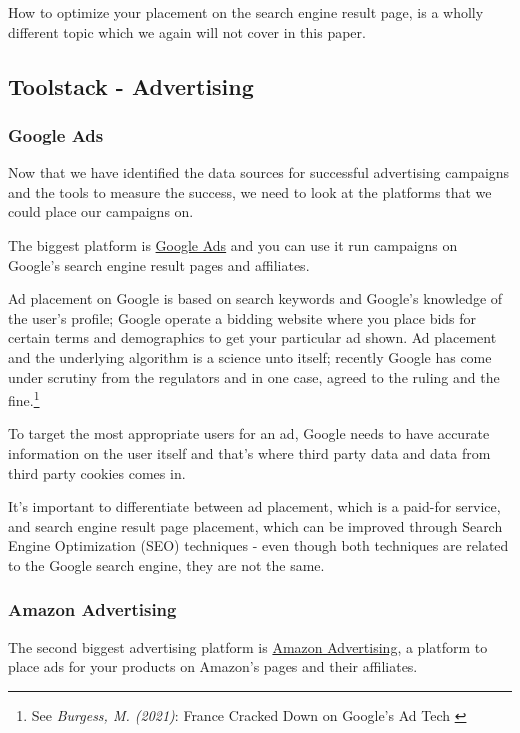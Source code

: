How to optimize your placement on the search engine result page, is a wholly different topic which we again will not cover in this paper.

\subsection{Toolstack - Advertising}

\subsubsection{Google Ads}

Now that we have identified the data sources for successful advertising campaigns and the tools to measure the success, we need to look at the platforms that we could place our campaigns on. 

The biggest platform is \href{https://ads.google.com/home/}{Google Ads} and you can use it run campaigns on Google's search engine result pages and affiliates.

Ad placement on Google is based on search keywords and Google's knowledge of the user's profile; Google operate a bidding website where you place bids for certain terms and demographics to get your particular ad shown. Ad placement and the underlying algorithm is a science unto itself; recently Google has come under scrutiny from the regulators and in one case, agreed to the ruling and the fine.\footnote{See \textit{Burgess, M. (2021)}: France Cracked Down on Google’s Ad Tech \cite{googleAds}}

To target the most appropriate users for an ad, Google needs to have accurate information on the user itself and that's where third party data and data from third party cookies comes in.

It's important to differentiate between ad placement, which is a paid-for service, and search engine result page placement, which can be improved through Search Engine Optimization (SEO) techniques - even though both techniques are related to the Google search engine, they are not the same.

\subsubsection{Amazon Advertising}

The second biggest advertising platform is \href{https://advertising.amazon.com//}{Amazon Advertising}, a platform to place ads for your products on Amazon's pages and their affiliates.

